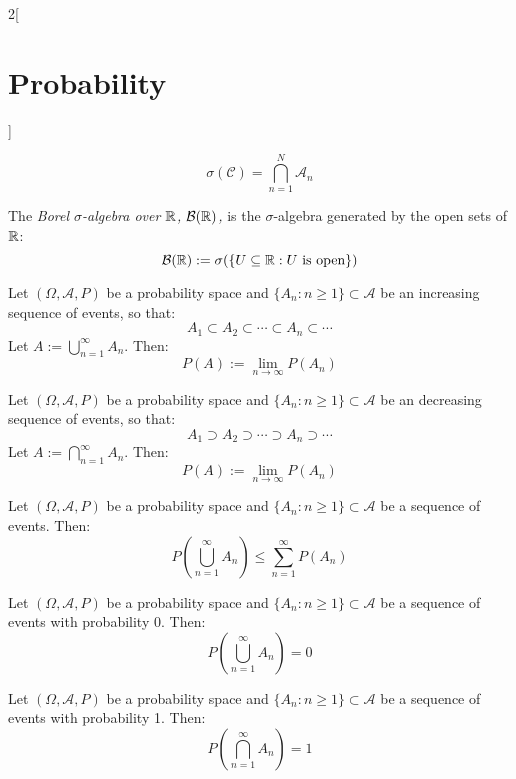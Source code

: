 \documentclass[../../../main.tex]{subfiles}
\begin{document}
\begin{multicols}{2}[\section{Probability}]
\begin{definition}
    $$\sigma(\mathcal{C})=\bigcap_{n=1}^N\mathcal{A}_n$$
  \end{definition}
  \begin{definition}
    The \textit{Borel $\sigma$-algebra over $\mathbb{R}$, $\mathcal{B}(\mathbb{R})$,} is the $\sigma$-algebra generated by the open sets of $\mathbb{R}$: $$\mathcal{B}(\mathbb{R}):=\sigma(\{U\subseteq\mathbb{R}:U\text{ is open}\})$$
  \end{definition}
  \begin{theorem}
    Let $(\Omega,\mathcal{A},P)$ be a probability space and $\{A_n:n\geq 1\}\subset\mathcal{A}$ be an increasing sequence of events, so that: $$A_1\subset A_2\subset\cdots\subset A_n\subset\cdots$$ Let $A:=\bigcup_{n=1}^\infty A_n$. Then: $$P(A):=\lim_{n\to\infty}P(A_n)$$
  \end{theorem}
  \begin{corollary}
    Let $(\Omega,\mathcal{A},P)$ be a probability space and $\{A_n:n\geq 1\}\subset\mathcal{A}$ be an decreasing sequence of events, so that: $$A_1\supset A_2\supset\cdots\supset A_n\supset\cdots$$ Let $A:=\bigcap_{n=1}^\infty A_n$. Then: $$P(A):=\lim_{n\to\infty}P(A_n)$$
  \end{corollary}
  \begin{prop}
    Let $(\Omega,\mathcal{A},P)$ be a probability space and $\{A_n:n\geq 1\}\subset\mathcal{A}$ be a sequence of events. Then: $$P\left(\bigcup_{n=1}^\infty A_n\right)\leq\sum_{n=1}^\infty P(A_n)$$
  \end{prop}
  \begin{corollary}
    Let $(\Omega,\mathcal{A},P)$ be a probability space and $\{A_n:n\geq 1\}\subset\mathcal{A}$ be a sequence of events with probability 0. Then: $$P\left(\bigcup_{n=1}^\infty A_n\right)=0$$
  \end{corollary}
  \begin{corollary}
    Let $(\Omega,\mathcal{A},P)$ be a probability space and $\{A_n:n\geq 1\}\subset\mathcal{A}$ be a sequence of events with probability 1. Then: $$P\left(\bigcap_{n=1}^\infty A_n\right)=1$$
  \end{corollary}

\end{multicols}
\end{document}
